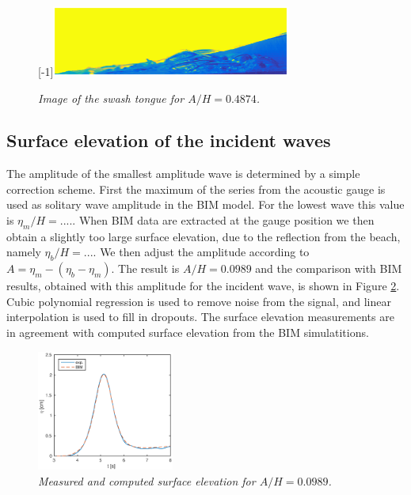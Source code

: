 \documentclass[a4paper, 11pt, english, twoside, openright]{article}
\begin{document}
\begin{figure}[]
\centering
\scalebox{1}[-1]{\includegraphics[angle=180,width=0.7\textwidth]{./Figures/BUBBLE/new_jan_bilde_bub.eps}}
\caption{\textit{Image of the swash tongue for $A/H=0.4874$. }}
\label{fig:boble_bevis}
\end{figure}

\subsection{Surface elevation of the incident waves}
\label{surf_elev}
The amplitude of the smallest amplitude wave is determined by
a simple correction scheme. First the maximum of the series from the 
acoustic gauge is used as solitary wave amplitude in the BIM model.
For the lowest wave this value is $\eta_m/H=....$.
When BIM data are extracted at the gauge position we then obtain 
a slightly too large surface elevation, due to the reflection from 
the beach, namely $\eta_b/H=...$. We then adjust the amplitude 
according to $A=\eta_m-(\eta_b-\eta_m)$. 
The result is $A/H=0.0989$ and the comparison with BIM results, obtained with this amplitude for the incident wave,
 is shown in Figure \ref{fig:surf_ele1}. Cubic polynomial regression is used to remove noise from the signal, and linear interpolation is used to fill 
in  dropouts. The surface elevation measurements are in agreement with computed surface elevation from  the BIM simulatitions.


\begin{figure}
\centering
\includegraphics[width=0.4\textwidth]{./Figures/BIM/BIM_probes.eps}
\caption{\textit{Measured and computed surface elevation for $A/H=0.0989$.}}
\label{fig:surf_ele1}
\end{figure}
\end{document}
